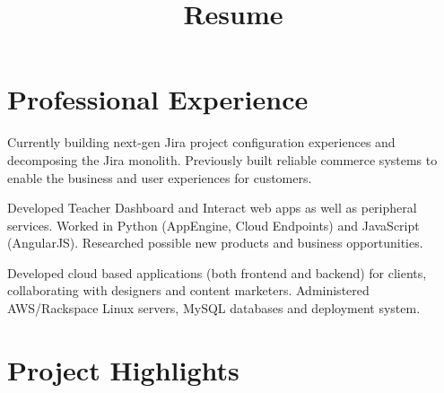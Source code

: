 \documentclass[11pt,a4paper,sans]{moderncv} %
\title{Resume}
\begin{document}
\makecvtitle%

\vspace{-1.5cm}


\section{Professional Experience}

{}{Currently building next-gen Jira project configuration experiences and
    decomposing the Jira monolith. Previously built reliable commerce systems to
    enable the business and user experiences for customers.}

{}{Developed Teacher Dashboard and Interact web apps as well as peripheral
    services. Worked in Python (AppEngine, Cloud Endpoints) and JavaScript
    (AngularJS). Researched possible new products and business opportunities.}

{}{Developed cloud based applications (both frontend and backend) for clients,
    collaborating with designers and content marketers. Administered
    AWS/Rackspace Linux servers, MySQL databases and deployment system.}


\section{Project Highlights}

\end{document}
